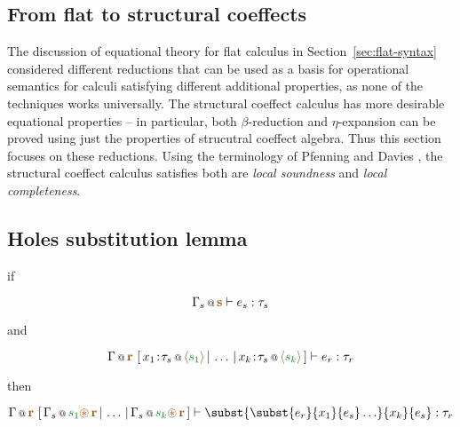 \subsection{From flat to structural coeffects}

The discussion of equational theory for flat calculus in Section~\ref{sec:flat-syntax} considered
different reductions that can be used as a basis for operational semantics for calculi satisfying
different additional properties, as none of the techniques works universally. The structural 
coeffect calculus has more desirable equational properties -- in particular, both $\beta$-reduction
and $\eta$-expansion can be proved using just the properties of strucutral coeffect algebra. Thus
this section focuses on these reductions. 
Using the terminology of Pfenning and Davies \cite{logic-modal-reconstruction},
the structural coeffect calculus satisfies both are \emph{local soundness} and \emph{local completeness}. 



\subsection{Holes substitution lemma}

if

\begin{equation*}
\coctx{\Gamma_s}{\aclrd{\textbf{s}}} \vdash e_s : \tau_s
\end{equation*}

and

\begin{equation*}
\coctx{\Gamma}{\aclrd{\textbf{r}}}~[\,\coctx{x_1\!:\!\tau_s}{\alift{\cclrd{s_1}}} \,|\, \ldots \,|\,
  \coctx{x_k\!:\!\tau_s}{\alift{\cclrd{s_k}}}\,] \vdash e_r : \tau_r
\end{equation*}

then

\begin{equation*}
\coctx{\Gamma}{\aclrd{\textbf{r}}}~[\,\coctx{\Gamma_s}{\cclrd{s_1}\aseq\,\aclrd{\textbf{r}}} \,|\, \ldots \,|\, 
  \coctx{\Gamma_s}{\cclrd{s_k}\aseq\,\aclrd{\textbf{r}}}\,] \vdash \subst{\subst{e_r}{x_1}{e_s}\ldots}{x_k}{e_s} : \tau_r
\end{equation*}

